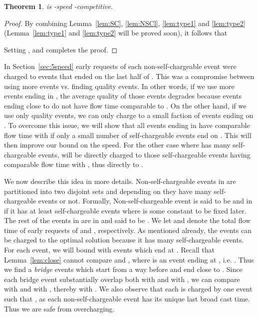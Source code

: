 \documentclass[11pt]{article}
\newtheorem{theorem}[lemma]{Theorem}
\begin{document}
\begin{titlepage}
\begin{theorem}
\label{thm:4spd}  is -speed -competitive.
\end{theorem}
\begin{proof}
    By combining Lemma~\ref{lem:SC}, \ref{lem:NSCl}, \ref{lem:type1} and \ref{lem:type2} (Lemma~\ref{lem:type1} and \ref{lem:type2} will be proved soon), it follows that

Setting ,  and  completes the proof.
\end{proof}



In Section~\ref{sec:5speed} early requests of each non-self-chargeable event  were charged to events that
ended on the last half of . This was a compromise between using more events vs. finding quality
events. In other words, if we use more events ending in , the average quality of those events degrades because  events ending close to  do not have flow time comparable to . On the other hand,
if we use only quality events, we can only charge to a small faction of events ending on . To overcome this issue, we will show that all events
ending in  have comparable flow time with  if only a small number of self-chargeable events end on .  This will then improve our bound on the speed.   For the other case where  has
many self-chargeable events,  will be directly charged to those self-chargeable events having comparable
flow time with , thus directly to .

We now describe this idea in more details. Non-self-chargeable events in  are partitioned into two disjoint sets
 and  depending on they have many self-chargeable events or not. Formally, Non-self-chargeable event
 is said to be  and in  if it has at least  self-chargeable events
where  is some constant to be fixed later. The rest of the events in  are in  and said to be .
We let  and  denote the total flow time of early requests of  and , respectively.
As mentioned already, the  events can be charged to the optimal solution because it has many self-chargeable
events. For each  event, we will bound  with events which end at . Recall that
Lemma~\ref{lem:close} cannot compare  and , where  is an event ending at , i.e.
. Thus we find a \emph{bridge} events which start from a way before  and end close to
. Since each bridge event  substantially overlap both with  and with , we can
compare  with  and  with , thereby  with . We also observe
that each  is charged by one event  such that , as each non-self-chargeable event
has its unique last broad cast time. Thus we are safe from overcharging.


\end{titlepage}
\end{document}
